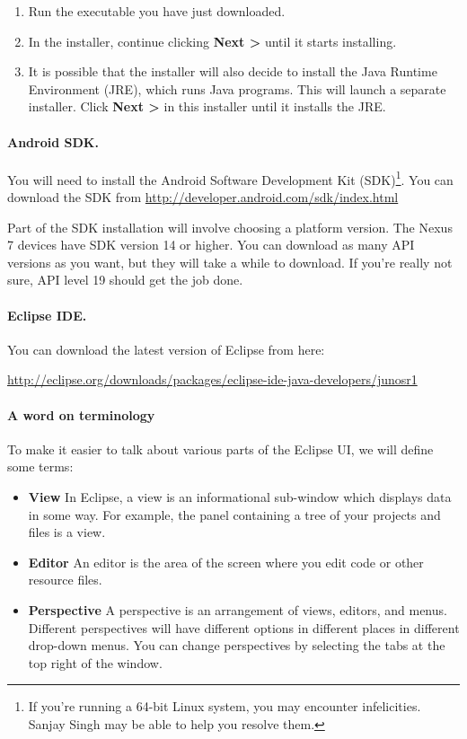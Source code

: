 \documentclass[10pt]{article}
\begin{document}
\begin{enumerate}
\item Run the executable you have just downloaded.
\item In the installer, continue clicking \textbf{Next >} until it starts installing.
\item It is possible that the installer will also decide to install the Java Runtime Environment (JRE), which runs Java programs. This will launch a separate installer. Click \textbf{Next >} in this installer until it installs the JRE.
\end{enumerate}

\paragraph{Android SDK.}
You will need to install the Android Software Development Kit (SDK)\footnote{If you're running a 64-bit Linux system, you may encounter infelicities. Sanjay Singh may be able to help you resolve them.}. You can download the SDK from \url{http://developer.android.com/sdk/index.html}

Part of the SDK installation will involve choosing a platform version. The Nexus 7 devices have SDK version 14 or higher. You can download as many API versions as you want, but they will take a while to download. If you're really not sure, API level 19 should get the job done.

\paragraph{Eclipse IDE.}
You can download the latest version of Eclipse from here: 

\qquad \url{http://eclipse.org/downloads/packages/eclipse-ide-java-developers/junosr1}

\paragraph{A word on terminology}
To make it easier to talk about various parts of the Eclipse UI, we will define some terms:

\begin{itemize}
\item \textbf{View} In Eclipse, a view is an informational sub-window which displays data in some way. For example, the panel containing a tree of your projects and files is a view.
\item \textbf{Editor} An editor is the area of the screen where you edit code or other resource files.
\item \textbf{Perspective} A perspective is an arrangement of views, editors, and menus. Different perspectives will have different options in different places in different drop-down menus. You can change perspectives by selecting the tabs at the top right of the window. 
\end{itemize}
\end{document}
